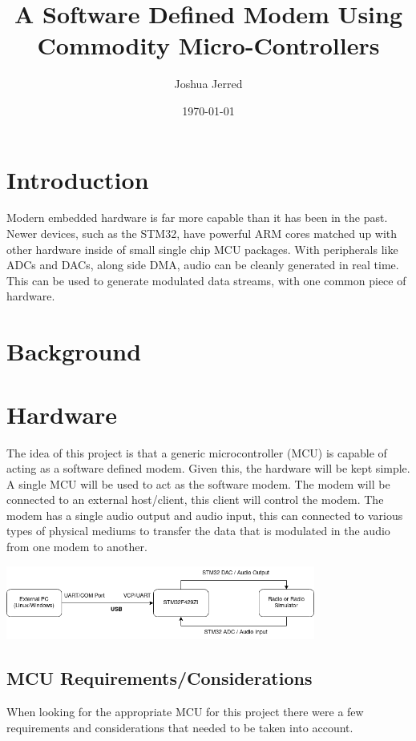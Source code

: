 \documentclass{journal}
\title{A Software Defined Modem Using Commodity Micro-Controllers}
\author{Joshua Jerred}
\date{\today}
\begin{document}
\maketitle

\section{Introduction}

Modern embedded hardware is far more capable than it has been in the past. Newer devices, such as the STM32, have powerful ARM cores matched up with other hardware inside of small single chip MCU packages. With peripherals like ADCs and DACs, along side DMA, audio can be cleanly generated in real time. This can be used to generate modulated data streams, with one common piece of hardware.

\section{Background}



\section{Hardware}
The idea of this project is that a generic microcontroller (MCU) is capable of acting as a software defined modem. Given this, the hardware will be kept simple. A single MCU will be used to act as the software modem. The modem will be connected to an external host/client, this client will control the modem. The modem has a single audio output and audio input, this can connected to various types of physical mediums to transfer the data that is modulated in the audio from one modem to another.

\includegraphics[width=4in]{images/hardware_outline}

\begin{center}
\subsection{MCU Requirements/Considerations}
\end{center}

When looking for the appropriate MCU for this project there were a few requirements and considerations that needed to be taken into account.
\end{document}
